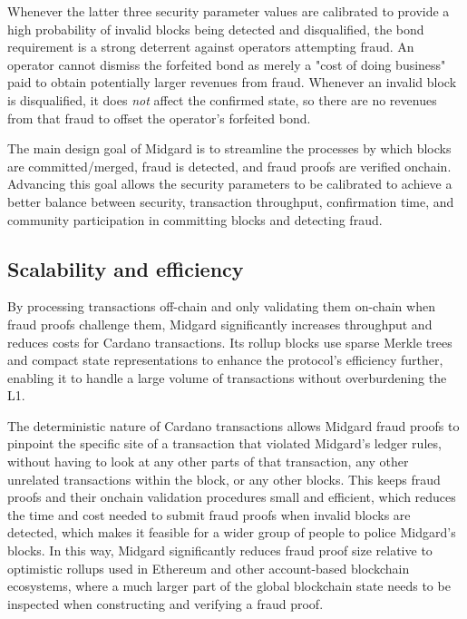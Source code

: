 \documentclass[../midgard.tex]{subfiles}
\begin{document}
Whenever the latter three security parameter values are calibrated to provide a high probability of invalid blocks being detected and disqualified, the bond requirement is a strong deterrent against operators attempting fraud. An operator cannot dismiss the forfeited bond as merely a "cost of doing business" paid to obtain potentially larger revenues from fraud. Whenever an invalid block is disqualified, it does \emph{not} affect the confirmed state, so there are no revenues from that fraud to offset the operator's forfeited bond.

The main design goal of Midgard is to streamline the processes by which blocks are committed/merged, fraud is detected, and fraud proofs are verified onchain. Advancing this goal allows the security parameters to be calibrated to achieve a better balance between security, transaction throughput, confirmation time, and community participation in committing blocks and detecting fraud.

\subsection*{Scalability and efficiency}
\label{h:scalability-and-efficiency}

By processing transactions off-chain and only validating them on-chain when fraud proofs challenge them, Midgard significantly increases throughput and reduces costs for Cardano transactions. Its rollup blocks use sparse Merkle trees and compact state representations to enhance the protocol's efficiency further, enabling it to handle a large volume of transactions without overburdening the L1.

The deterministic nature of Cardano transactions allows Midgard fraud proofs to pinpoint the specific site of a transaction that violated Midgard's ledger rules, without having to look at any other parts of that transaction, any other unrelated transactions within the block, or any other blocks. This keeps fraud proofs and their onchain validation procedures small and efficient, which reduces the time and cost needed to submit fraud proofs when invalid blocks are detected, which makes it feasible for a wider group of people to police Midgard's blocks. In this way, Midgard significantly reduces fraud proof size relative to optimistic rollups used in Ethereum and other account-based blockchain ecosystems, where a much larger part of the global blockchain state needs to be inspected when constructing and verifying a fraud proof.
\end{document}
